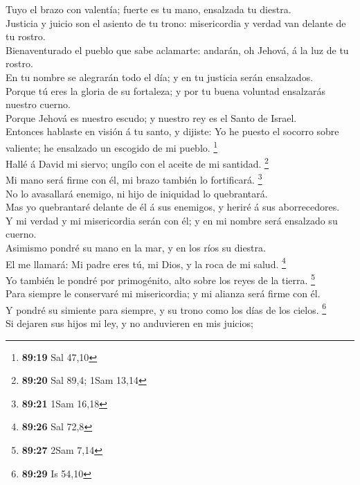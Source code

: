 Tuyo el brazo con valentía; fuerte es tu mano, ensalzada
tu diestra.\\
 Justicia y juicio son el asiento de tu trono: misericordia
y verdad van delante de tu rostro.\\
 Bienaventurado el pueblo que sabe aclamarte: andarán, oh
Jehová, á la luz de tu rostro.\\
 En tu nombre se alegrarán todo el día; y en tu justicia
serán ensalzados.\\
 Porque tú eres la gloria de su fortaleza; y por tu buena
voluntad ensalzarás nuestro cuerno.\\
 Porque Jehová es nuestro escudo; y nuestro rey es el Santo
de Israel.\\
 Entonces hablaste en visión á tu santo, y dijiste: Yo he
puesto el socorro sobre valiente; he ensalzado un escogido de mi pueblo.
\footnote{\textbf{89:19} Sal 47,10}\\
 Hallé á David mi siervo; ungílo con el aceite de mi
santidad. \footnote{\textbf{89:20} Sal 89,4; 1Sam 13,14}\\
 Mi mano será firme con él, mi brazo también lo
fortificará. \footnote{\textbf{89:21} 1Sam 16,18}\\
 No lo avasallará enemigo, ni hijo de iniquidad lo
quebrantará.\\
 Mas yo quebrantaré delante de él á sus enemigos, y heriré
á sus aborrecedores.\\
 Y mi verdad y mi misericordia serán con él; y en mi nombre
será ensalzado su cuerno.\\
 Asimismo pondré su mano en la mar, y en los ríos su
diestra.\\
 El me llamará: Mi padre eres tú, mi Dios, y la roca de mi
salud. \footnote{\textbf{89:26} Sal 72,8}\\
 Yo también le pondré por primogénito, alto sobre los reyes
de la tierra. \footnote{\textbf{89:27} 2Sam 7,14}\\
 Para siempre le conservaré mi misericordia; y mi alianza
será firme con él.\\
 Y pondré su simiente para siempre, y su trono como los
días de los cielos. \footnote{\textbf{89:29} Is 54,10}\\
 Si dejaren sus hijos mi ley, y no anduvieren en mis
juicios;\\

